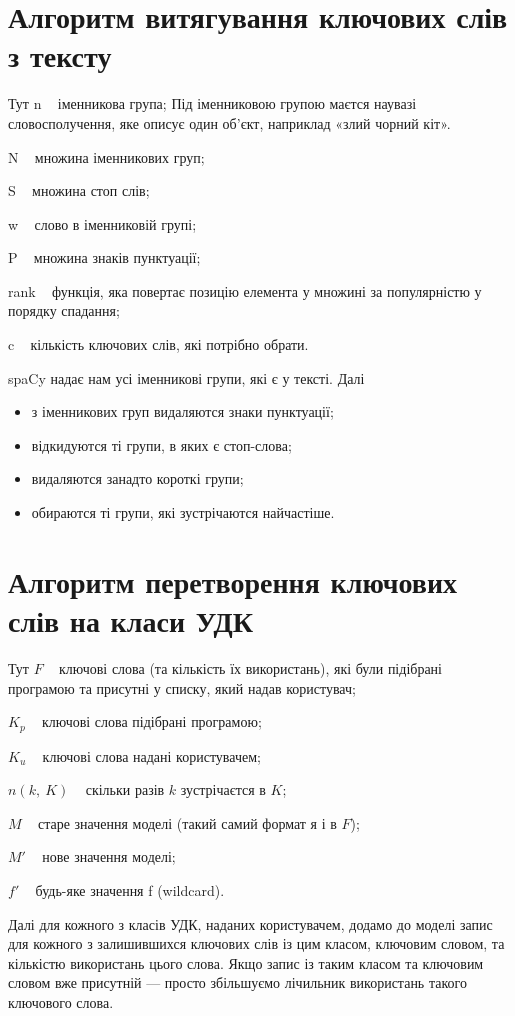 \documentclass{article}
\let\oldsection\section
\renewcommand{\section}{\clearpage\oldsection}
\begin{document}
\section{Алгоритм витягування ключових слів з тексту}
Тут n \textemdash~ іменникова група; Під іменниковою групою маєтся наувазі словосполучення,
яке описує один об'єкт, наприклад «злий чорний кіт».
  
  N \textemdash~ множина іменникових груп;
  
  S \textemdash~ множина стоп слів;
  
  w \textemdash~ слово в іменниковій групі;
  
  P \textemdash~ множина знаків пунктуації;
  
  rank \textemdash~ функція,
      яка повертає позицію елемента у множині за популярністю
      у порядку спадання;
  
  c \textemdash~ кількість ключових слів, які потрібно обрати.

	spaCy надає нам усі іменникові групи, які є у тексті. Далі
\begin{itemize}
  \item з іменникових груп видаляются знаки пунктуації;
  \item відкидуются ті групи, в яких є стоп-слова;
  \item видаляются занадто короткі групи;
  \item обираются ті групи, які зустрічаются найчастіше.
\end{itemize}


\section{Алгоритм перетворення ключових слів на класи УДК}
Тут $F$ \textemdash~ ключові слова (та кількість їх використань),
      які були підібрані програмою та присутні у списку, який надав користувач;

  $K_p$ \textemdash~ ключові слова підібрані програмою;

  $K_u$ \textemdash~ ключові слова надані користувачем;

  $n(k,~ K)$ \textemdash~ скільки разів $k$ зустрічаєтся в $K$;

  $M$ \textemdash~ старе значення моделі (такий самий формат я і в $F$);

  $M'$ \textemdash~ нове значення моделі;

  $f'$ \textemdash~ будь-яке значення f (wildcard).

  Далі для кожного з класів УДК, наданих користувачем,
  додамо до моделі запис для кожного з залишившихся ключових слів із цим класом,
  ключовим словом, та кількістю використань цього слова.
  Якщо запис із таким класом та ключовим словом вже присутній ---
  просто збільшуємо лічильник використань такого ключового слова.
\end{document}
